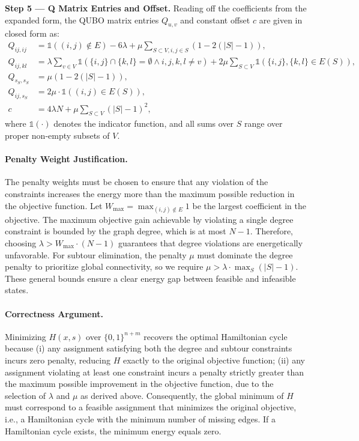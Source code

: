 \documentclass[12pt]{article}
\begin{document}
\textbf{Step 5 --- Q Matrix Entries and Offset.}
Reading off the coefficients from the expanded form, the QUBO matrix entries $Q_{u,v}$ and constant offset $c$ are given in closed form as:
\begin{align}
Q_{ij,ij} &= \mathbb{1}((i,j) \notin E) - 6\lambda + \mu \sum_{S \subset V, i,j \in S} (1 - 2(|S|-1)), \\
Q_{ij,kl} &= \lambda \sum_{v \in V} \mathbb{1}(\{i,j\} \cap \{k,l\} = \emptyset \land i,j,k,l \neq v) + 2\mu \sum_{S \subset V} \mathbb{1}(\{i,j\},\{k,l\} \in E(S)), \\
Q_{s_S, s_S} &= \mu (1 - 2(|S|-1)), \\
Q_{ij, s_S} &= 2\mu \cdot \mathbb{1}((i,j) \in E(S)), \\
c &= 4\lambda N + \mu \sum_{S \subset V} (|S|-1)^2,
\end{align}
where $\mathbb{1}(\cdot)$ denotes the indicator function, and all sums over $S$ range over proper non-empty subsets of $V$.

\paragraph{Penalty Weight Justification.}
The penalty weights must be chosen to ensure that any violation of the constraints increases the energy more than the maximum possible reduction in the objective function. Let $W_{\max} = \max_{(i,j) \notin E} 1$ be the largest coefficient in the objective. The maximum objective gain achievable by violating a single degree constraint is bounded by the graph degree, which is at most $N-1$. Therefore, choosing $\lambda > W_{\max} \cdot (N-1)$ guarantees that degree violations are energetically unfavorable. For subtour elimination, the penalty $\mu$ must dominate the degree penalty to prioritize global connectivity, so we require $\mu > \lambda \cdot \max_S (|S|-1)$. These general bounds ensure a clear energy gap between feasible and infeasible states.

\paragraph{Correctness Argument.}
Minimizing $H(x,s)$ over $\{0,1\}^{n+m}$ recovers the optimal Hamiltonian cycle because (i) any assignment satisfying both the degree and subtour constraints incurs zero penalty, reducing $H$ exactly to the original objective function; (ii) any assignment violating at least one constraint incurs a penalty strictly greater than the maximum possible improvement in the objective function, due to the selection of $\lambda$ and $\mu$ as derived above. Consequently, the global minimum of $H$ must correspond to a feasible assignment that minimizes the original objective, i.e., a Hamiltonian cycle with the minimum number of missing edges. If a Hamiltonian cycle exists, the minimum energy equals zero.
\end{document}
